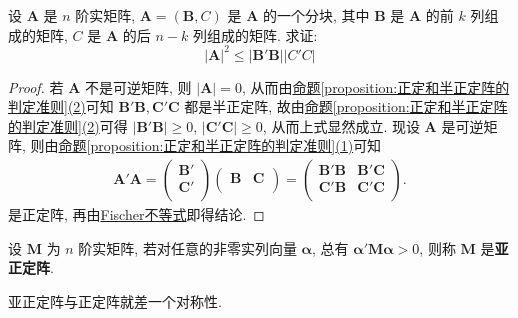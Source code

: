\documentclass[../../main.tex]{subfiles}%
\begin{document}
\begin{proposition}
设 \(\boldsymbol{A}\) 是 \(n\) 阶实矩阵, \(\boldsymbol{A}=(\boldsymbol{B},C)\) 是 \(\boldsymbol{A}\) 的一个分块, 其中 \(\boldsymbol{B}\) 是 \(\boldsymbol{A}\) 的前 \(k\) 列组成的矩阵, \(C\) 是 \(\boldsymbol{A}\) 的后 \(n - k\) 列组成的矩阵. 求证:
\[|\boldsymbol{A}|^2\leqslant |\boldsymbol{B}'\boldsymbol{B}||C'C|\]
\end{proposition}
\begin{proof}

若 \(\boldsymbol{A}\) 不是可逆矩阵, 则 \(|\boldsymbol{A}| = 0\), 从而由\hyperref[proposition:正定和半正定阵的判定准则]{命题\ref{proposition:正定和半正定阵的判定准则}(2)}可知 \(\boldsymbol{B}'\boldsymbol{B},\boldsymbol{C}'\boldsymbol{C}\) 都是半正定阵, 故由\hyperref[proposition:正定和半正定阵的判定准则]{命题\ref{proposition:正定和半正定阵的判定准则}(2)}可得 \(|\boldsymbol{B}'\boldsymbol{B}|\geqslant 0\), \(|\boldsymbol{C}'\boldsymbol{C}|\geqslant 0\), 从而上式显然成立. 现设 \(\boldsymbol{A}\) 是可逆矩阵, 则由\hyperref[proposition:正定和半正定阵的判定准则]{命题\ref{proposition:正定和半正定阵的判定准则}(1)}可知
\begin{align*}
\boldsymbol{A}' \boldsymbol{A}=\left( \begin{array}{c}
\boldsymbol{B}'\\
\boldsymbol{C}'\\
\end{array} \right) \left( \begin{matrix}
\boldsymbol{B}&		\boldsymbol{C}\\
\end{matrix} \right) =\left( \begin{matrix}
\boldsymbol{B}' \boldsymbol{B}&		\boldsymbol{B}' \boldsymbol{C}\\
\boldsymbol{C}' \boldsymbol{B}&		\boldsymbol{C}' \boldsymbol{C}\\
\end{matrix} \right) .
\end{align*}
是正定阵, 再由\hyperref[proposition:Fischer不等式]{Fischer不等式}即得结论. 

\end{proof}

\begin{definition}[亚正定阵]
设 \(\boldsymbol{M}\) 为 \(n\) 阶实矩阵, 若对任意的非零实列向量 \(\boldsymbol{\alpha}\), 总有 \(\boldsymbol{\alpha}'\boldsymbol{M}\boldsymbol{\alpha}>0\), 则称 \(\boldsymbol{M}\) 是\textbf{亚正定阵}. 
\end{definition}
\begin{remark}
亚正定阵与正定阵就差一个对称性.
\end{remark}
\end{document}

